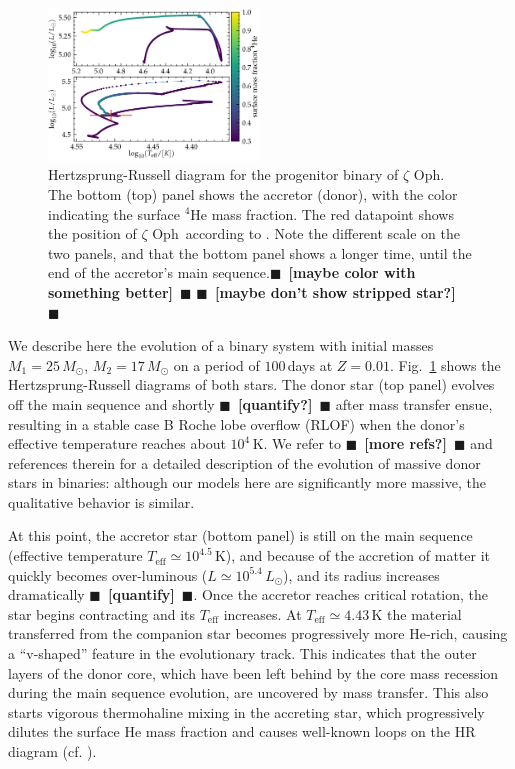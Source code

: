 \documentclass[twocolumn,twocolappendix,trackchanges]{aastex63}
\DeclareRobustCommand{\Figref}[1]{Fig.~\ref{#1}}
\newcommand{\zoph}{$\zeta$ Oph}
\newcommand{\todo}[1]{{\large $\blacksquare$~\textbf{\color{red}[#1]}}~$\blacksquare$}
\begin{document}
\begin{figure}[htbp]
  \includegraphics[width=0.5\textwidth]{HRD_both}
  \caption{Hertzsprung-Russell diagram for the progenitor binary of
    \zoph. The bottom (top) panel shows the accretor (donor), with the
    color indicating the surface $^4\mathrm{He}$ mass fraction. The
    red datapoint shows the position of \zoph\ according to
    \cite{villamariz:05}. Note the different scale on the two panels,
    and that the bottom panel shows a longer time, until the end of
    the accretor's main sequence.\todo{maybe color with something
      better}
  \todo{maybe don't show stripped star?}}
  \label{fig:HRD_both}
\end{figure}


We describe here the evolution of a binary system with initial masses
$M_1=25\,M_\odot$, $M_2=17\,M_\odot$ on a period of $100$\,days at
$Z=0.01$. \Figref{fig:HRD_both} shows the Hertzsprung-Russell diagrams
of both stars. The donor star (top panel) evolves off the main
sequence and shortly \todo{quantify?} after mass transfer ensue, resulting in a stable
case B \citep{kippenhahn:67} Roche lobe overflow (RLOF) when the
donor's effective temperature reaches about $10^4$\,K. We refer to
\cite{gotberg:17, laplace:21} \todo{more refs?} and references therein for a detailed
description of the evolution of massive donor stars in binaries:
although our models here are significantly more massive, the
qualitative behavior is similar.

At this point, the accretor star (bottom panel) is still on the main sequence
(effective temperature $T_\mathrm{eff}\simeq10^{4.5}$\,K), and because of the accretion of
matter it quickly becomes over-luminous ($L\simeq10^{5.4}\,L_\odot$),
and its radius increases dramatically \todo{quantify}. Once the
accretor reaches critical rotation, the star begins contracting and
its $T_\mathrm{eff}$ increases. At $T_\mathrm{eff}\simeq 4.{43}$\,K
the material transferred from the companion star becomes progressively
more He-rich, causing a ``v-shaped'' feature in the evolutionary
track. This indicates that the outer layers of the donor core, which
have been left behind by the core mass recession during the main
sequence evolution, are uncovered by mass transfer. This also starts
vigorous thermohaline mixing in the accreting star, which
progressively dilutes the surface He mass fraction and causes
well-known loops on the HR diagram (cf. \citealt{cantiello:07}).
\end{document}
